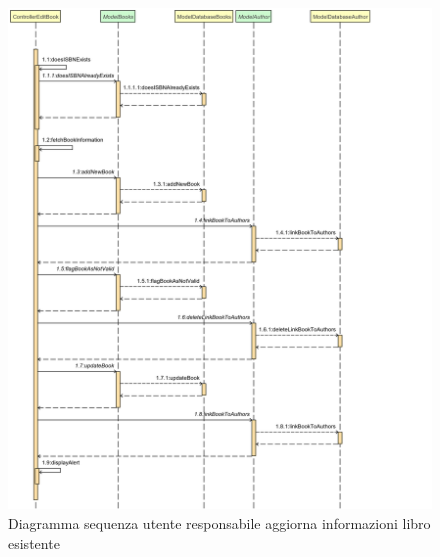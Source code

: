 \documentclass[a4paper,11pt]{report}
\begin{document}
\begin{figure}[h!]
    	\centering
    	\hspace*{-0.2in}
    	\includegraphics[width=1.3\linewidth]{Sequence diagrams/3 Manager/editBookManager.png}
    	\caption{Diagramma sequenza utente responsabile aggiorna informazioni libro esistente}
    \end{figure} \leavevmode \\
    
\end{document}
